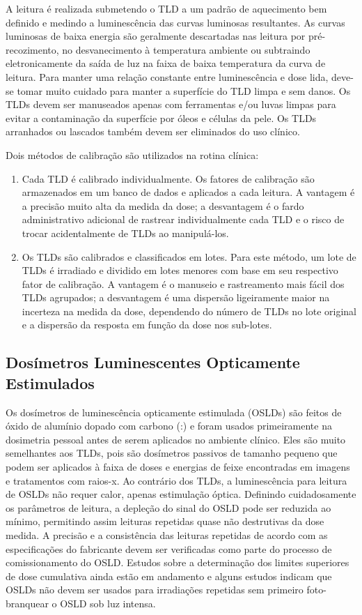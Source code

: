 \documentclass[11pt,a4paper]{article}
\begin{document}
	A leitura é realizada submetendo o TLD a um padrão de aquecimento bem definido e medindo a luminescência das curvas luminosas resultantes. As curvas luminosas de baixa energia são geralmente descartadas nas leitura por pré-recozimento, no desvanecimento à temperatura ambiente ou subtraindo eletronicamente da saída de luz na faixa de baixa temperatura da curva de leitura. Para manter uma relação constante entre luminescência e dose lida, deve-se tomar muito cuidado para manter a superfície do TLD limpa e sem danos. Os TLDs devem ser manuseados apenas com ferramentas e/ou luvas limpas para evitar a contaminação da superfície por óleos e células da pele. Os TLDs arranhados ou lascados também devem ser eliminados do uso clínico.

	Dois métodos de calibração são utilizados na rotina clínica:

	\begin{enumerate}
		\item Cada TLD é calibrado individualmente. Os fatores de calibração são armazenados em um banco de dados e aplicados a cada leitura. A vantagem é a precisão muito alta da medida da dose; a desvantagem é o fardo administrativo adicional de rastrear individualmente cada TLD e o risco de trocar acidentalmente de TLDs ao manipulá-los.
		
		\item Os TLDs são calibrados e classificados em lotes. Para este método, um lote de TLDs é irradiado e dividido em lotes menores com base em seu respectivo fator de calibração. A vantagem é o manuseio e rastreamento mais fácil dos TLDs agrupados; a desvantagem é uma dispersão ligeiramente maior na incerteza na medida da dose, dependendo do número de TLDs no lote original e a dispersão da resposta em função da dose nos sub-lotes.
	\end{enumerate}

\subsection{Dosímetros Luminescentes Opticamente Estimulados}

	Os dosímetros de luminescência opticamente estimulada (OSLDs) são feitos de óxido de alumínio dopado com carbono (:) e foram usados primeiramente na dosimetria pessoal antes de serem aplicados no ambiente clínico. Eles são muito semelhantes aos TLDs, pois são dosímetros passivos de tamanho pequeno que podem ser aplicados à faixa de doses e energias de feixe encontradas em imagens e tratamentos com raios-x. Ao contrário dos TLDs, a luminescência para leitura de OSLDs não requer calor, apenas estimulação óptica. Definindo cuidadosamente os parâmetros de leitura, a depleção do sinal do OSLD pode ser reduzida ao mínimo, permitindo assim leituras repetidas quase não destrutivas da dose medida. A precisão e a consistência das leituras repetidas de acordo com as especificações do fabricante devem ser verificadas como parte do processo de comissionamento do OSLD. Estudos sobre a determinação dos limites superiores de dose cumulativa ainda estão em andamento e alguns estudos indicam que OSLDs não devem ser usados para irradiações repetidas sem primeiro foto-branquear o OSLD sob luz intensa.
\end{document}
